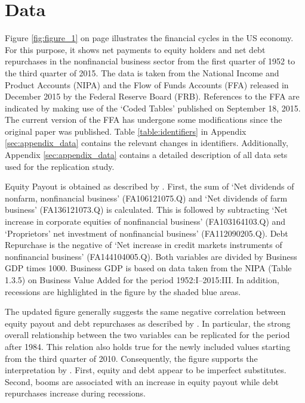 \section{Data}
\label{sec:data}



Figure \ref{fig:figure_1} on page \pageref{fig:figure_1} illustrates the financial cycles in the US economy. For this purpose, it shows net payments to equity holders and net debt repurchases in the nonfinancial business sector from the first quarter of 1952 to the third quarter of 2015. The data is taken from the National Income and Product Accounts (NIPA) and the Flow of Funds Accounts (FFA) released in December 2015 by the Federal Reserve Board (FRB). References to the FFA are indicated by making use of the ‘Coded Tables’ published on September 18, 2015. The current version of the FFA has undergone some modifications since the original paper was published. Table \ref{table:identifiers} in Appendix \ref{sec:appendix_data} contains the relevant changes in identifiers. Additionally, Appendix \ref{sec:appendix_data} contains a detailed description of all data sets used for the replication study.

Equity Payout is obtained as described by \citeauthor{JERMANNfinancial}. First, the sum of ‘Net dividends of nonfarm, nonfinancial business’ (FA106121075.Q) and ‘Net dividends of farm business’ (FA136121073.Q) is calculated. This is followed by subtracting ‘Net increase in corporate equities of nonfinancial business’ (FA103164103.Q) and ‘Proprietors’ net investment of nonfinancial business’ (FA112090205.Q). Debt Repurchase is the negative of ‘Net increase in credit markets instruments of nonfinancial business’ (FA144104005.Q). Both variables are divided by Business GDP times 1000. Business GDP is based on data taken from the NIPA (Table 1.3.5) on Business Value Added for the period 1952:I--2015:III. In addition, recessions are highlighted in the figure by the shaded blue areas.

The updated figure generally suggests the same negative correlation between equity payout and debt repurchases as described by \citeauthor{JERMANNfinancial}. In particular, the strong overall relationship between the two variables can be replicated for the period after 1984. This relation also holds true for the newly included values starting from the third quarter of 2010. 
Consequently, the figure supports the interpretation by \citeauthor{JERMANNfinancial}. First, equity and debt appear to be imperfect substitutes. Second, booms are associated with an increase in equity payout while debt repurchases increase during recessions.
